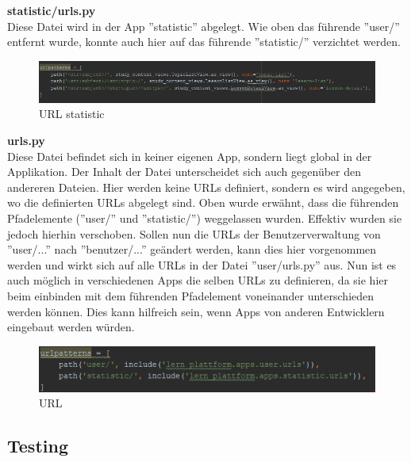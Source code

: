 \noindent \textbf{statistic/urls.py} \\
Diese Datei wird in der App ''statistic'' abgelegt. Wie oben das führende ''user/'' entfernt wurde, konnte auch hier auf das führende ''statistic/'' verzichtet werden. \\
\begin{minipage}{\textwidth}
	\begin{figure}[H]
		\includegraphics[width=\textwidth, height=\textheight, keepaspectratio]{images/URLstatistic.png}
		\caption{URL statistic}
	\end{figure}
\end{minipage}


\noindent \textbf{urls.py} \\
Diese Datei befindet sich in keiner eigenen App, sondern liegt global in der Applikation. Der Inhalt der Datei unterscheidet sich auch gegenüber den andereren Dateien. Hier werden keine URLs definiert, sondern es wird angegeben, wo die definierten URLs abgelegt sind. Oben wurde erwähnt, dass die führenden Pfadelemente (''user/'' und ''statistic/'') weggelassen wurden. Effektiv wurden sie jedoch hierhin verschoben. Sollen nun die URLs der Benutzerverwaltung von ''user/...'' nach ''benutzer/...'' geändert werden, kann dies hier vorgenommen werden und wirkt sich auf alle URLs in der Datei ''user/urls.py'' aus. Nun ist es auch möglich in verschiedenen Apps die selben URLs zu definieren, da sie hier beim einbinden mit dem führenden Pfadelement voneinander unterschieden werden können. Dies kann hilfreich sein, wenn Apps von anderen Entwicklern eingebaut werden würden.
\begin{minipage}{\textwidth}
	\begin{figure}[H]
		\includegraphics[width=\textwidth, height=\textheight, keepaspectratio]{images/URLglobal.png}
		\caption{URL}
	\end{figure}
\end{minipage}




\subsection{Testing}


